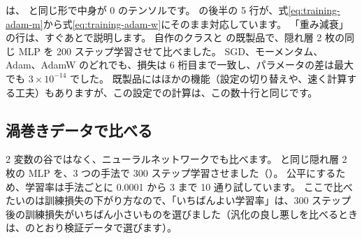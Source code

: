 は、 と同じ形で中身が 0 のテンソルです。
 の後半の 5 行が、式\eqref{eq:training-adam-m}から式\eqref{eq:training-adam-w}にそのまま対応しています。
「重み減衰」の行は、すぐあとで説明します。
自作のクラスと  の既製品で、隠れ層 2 枚の同じ MLP を 200 ステップ学習させて比べました。
SGD、モーメンタム、Adam、AdamW のどれでも、損失は 6 桁目まで一致し、パラメータの差は最大でも $3\times10^{-14}$ でした。
既製品にはほかの機能（設定の切り替えや、速く計算する工夫）もありますが、この設定での計算は、この数十行と同じです。

\subsection*{渦巻きデータで比べる}

2 変数の谷ではなく、ニューラルネットワークでも比べます。
と同じ隠れ層 2 枚の MLP を、3 つの手法で 300 ステップ学習させました（）。
公平にするため、学習率は手法ごとに 0.0001 から 3 まで 10 通り試しています。
ここで比べたいのは訓練損失の下がり方なので、「いちばんよい学習率」は、300 ステップ後の訓練損失がいちばん小さいものを選びました（汎化の良し悪しを比べるときは、のとおり検証データで選びます）。

